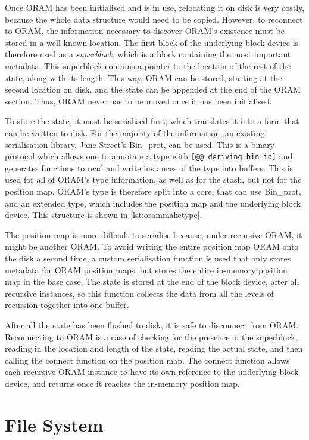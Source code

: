 \documentclass[12pt,a4paper,twoside,openright]{report}
\begin{document}
Once ORAM has been initialised and is in use, relocating it on disk is very costly, because the whole data structure would need to be copied. However, to reconnect to ORAM, the information necessary to discover ORAM's existence must be stored in a well-known location. The first block of the underlying block device is therefore used as a \emph{superblock}, which is a block containing the most important metadata. This superblock contains a pointer to the location of the rest of the state, along with its length. This way, ORAM can be stored, starting at the second location on disk, and the state can be appended at the end of the ORAM section. Thus, ORAM never has to be moved once it has been initialised.

To store the state, it must be serialised first, which translates it into a form that can be written to disk. For the majority of the information, an existing serialisation library, Jane Street's Bin\_prot, can be used. This is a binary protocol which allows one to annotate a type with \texttt{[@@ deriving bin\_io]} and generates functions to read and write instances of the type into buffers. This is used for all of ORAM's type information, as well as for the stash, but not for the position map. ORAM's type is therefore split into a core, that can use Bin\_prot, and an extended type, which includes the position map and the underlying block device. This structure is shown in \cref{lst:orammaketype}.

The position map is more difficult to serialise because, under recursive ORAM, it might be another ORAM. To avoid writing the entire position map ORAM onto the disk a second time, a custom serialisation function is used that only stores metadata for ORAM position maps, but stores the entire in-memory position map in the base case. The state is stored at the end of the block device, after all recursive instances, so this function collects the data from all the levels of recursion together into one buffer.

After all the state has been flushed to disk, it is safe to disconnect from ORAM. Reconnecting to ORAM is a case of checking for the presence of the superblock, reading in the location and length of the state, reading the actual state, and then calling the connect function on the position map. The connect function allows each recursive ORAM instance to have its own reference to the underlying block device, and returns once it reaches the in-memory position map.

\section{File System}
\label{sec:fileSystem}
\end{document}
